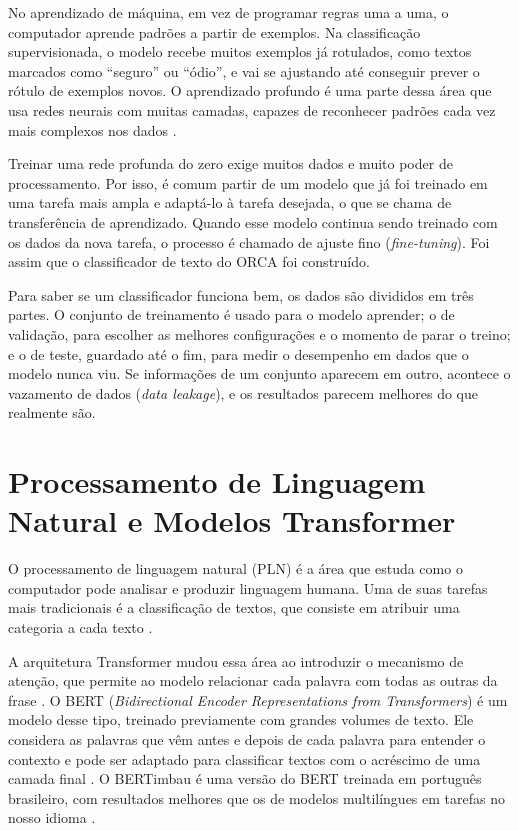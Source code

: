 \documentclass[
    12pt,           %
    oneside,        %
    a4paper,        %
    chapter=TITLE,  %
    english,        %
    brazil          %
]{abntex2}
\begin{document}
No aprendizado de máquina, em vez de programar regras uma a uma, o computador
aprende padrões a partir de exemplos. Na classificação supervisionada, o
modelo recebe muitos exemplos já rotulados, como textos marcados como
``seguro'' ou ``ódio'', e vai se ajustando até conseguir prever o rótulo de
exemplos novos. O aprendizado profundo é uma parte dessa área que usa redes
neurais com muitas camadas, capazes de reconhecer padrões cada vez mais
complexos nos dados \cite{goodfellow2016}.

Treinar uma rede profunda do zero exige muitos dados e muito poder de
processamento. Por isso, é comum partir de um modelo que já foi treinado em
uma tarefa mais ampla e adaptá-lo à tarefa desejada, o que se chama de
transferência de aprendizado. Quando esse modelo continua sendo treinado com
os dados da nova tarefa, o processo é chamado de ajuste fino
(\textit{fine-tuning}). Foi assim que o classificador de texto do ORCA foi
construído.

Para saber se um classificador funciona bem, os dados são divididos em três
partes. O conjunto de treinamento é usado para o modelo aprender; o de
validação, para escolher as melhores configurações e o momento de parar o
treino; e o de teste, guardado até o fim, para medir o desempenho em dados que
o modelo nunca viu. Se informações de um conjunto aparecem em outro, acontece
o vazamento de dados (\textit{data leakage}), e os resultados parecem melhores
do que realmente são.

\section{Processamento de Linguagem Natural e Modelos Transformer}

O processamento de linguagem natural (PLN) é a área que estuda como o
computador pode analisar e produzir linguagem humana. Uma de suas tarefas mais
tradicionais é a classificação de textos, que consiste em atribuir uma
categoria a cada texto \cite{jurafsky2025}.

A arquitetura Transformer mudou essa área ao introduzir o mecanismo de
atenção, que permite ao modelo relacionar cada palavra com todas as outras da
frase \cite{vaswani2017}. O BERT (\textit{Bidirectional Encoder
Representations from Transformers}) é um modelo desse tipo, treinado
previamente com grandes volumes de texto. Ele considera as palavras que vêm
antes e depois de cada palavra para entender o contexto e pode ser adaptado
para classificar textos com o acréscimo de uma camada final
\cite{devlin2019}. O BERTimbau é uma versão do BERT treinada em português
brasileiro, com resultados melhores que os de modelos multilíngues em tarefas
no nosso idioma \cite{souza2020}.
\end{document}

